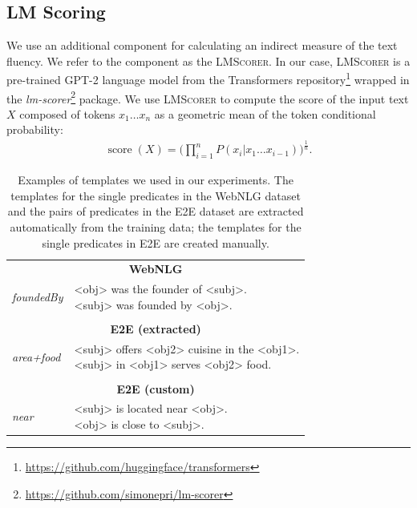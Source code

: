 \subsection{LM Scoring}
We use an additional component for calculating an indirect measure of the text fluency. We refer to the component as the \textsc{LMScorer}. In our case,  \textsc{LMScorer} is a pre-trained GPT-2 language model \citep{radford2019language} from the Transformers repository\footnote{\url{https://github.com/huggingface/transformers}} \citep{Wolf2019HuggingFacesTS} wrapped in the \textit{lm-scorer}\footnote{\url{https://github.com/simonepri/lm-scorer}} package. We use \textsc{LMScorer} to compute the score of the input text $X$ composed of tokens $x_1\ldots x_n$ as a geometric mean of the token conditional probability:
\begin{align*}
    \operatorname{score}(X) = \Bigg( \prod_{i=1}^{n}{P(x_i|x_1 \ldots x_{i-1})} \Bigg)^{\frac{1}{n}}.
\end{align*}

\begin{table}[t]%
    \centering\small
    \begin{tabular}{ll}
        \multicolumn{2}{c}{\textbf{WebNLG}}                                           \\[0.1cm]
        \textit{foundedBy} & \pbox{10cm}{<obj> was the founder of <subj>.             \\<subj> was founded by <obj>.} \\[0.2cm] \midrule  \\[-0.3cm]
        \multicolumn{2}{c}{\textbf{E2E (extracted)}}                                  \\[0.1cm]
        \textit{area+food} & \pbox{5.5cm}{<subj> offers <obj2> cuisine in the <obj1>. \\ <subj> in <obj1> serves <obj2> food.} \\[0.2cm] \midrule \\[-0.3cm]
        \multicolumn{2}{c}{\textbf{E2E (custom)}}                                     \\[0.1cm]
        \textit{near}      & \pbox{5cm}{<subj> is located near <obj>.                 \\ <obj> is close to <subj>.}
    \end{tabular}
    \caption{Examples of templates we used in our experiments. The templates for the single predicates in the WebNLG dataset and the pairs of predicates in the E2E dataset are extracted automatically from the training data; the templates for the single predicates in E2E are created manually.}
    \label{tab:templates_ex}
\end{table}

